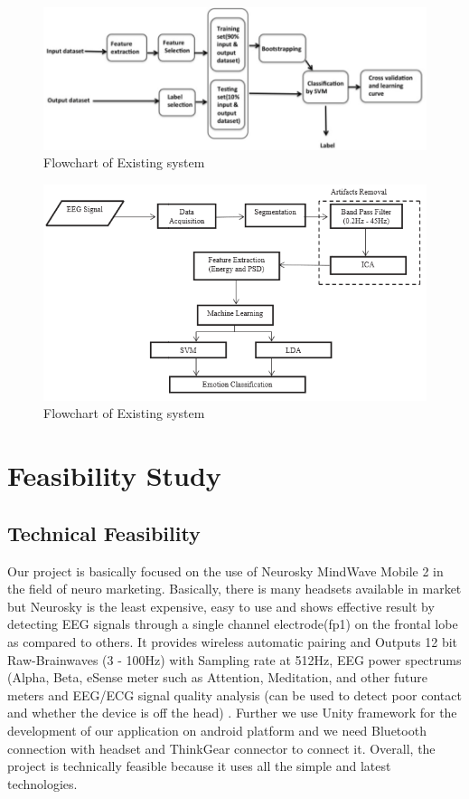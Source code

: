 \documentclass[a4paper, 12pt, oneside]{uet_thesis}
\begin{document}
\begin{figure}[htbp]
\centerline{\includegraphics[scale=0.7]{Existing2.png}}
\caption{Flowchart of Existing system  \cite{b15} }
\label{Table4}
\end{figure}
\newpage
\begin{figure}[htbp]
\centerline{\includegraphics[scale=0.8]{Existing3.png}}
\caption{Flowchart of Existing system  \cite{b18}}
\label{Table4}
\end{figure}



\newpage
\chapter{Feasibility Study}
\section{Technical Feasibility}

Our project is basically focused on the use of Neurosky MindWave Mobile 2 in the field of neuro marketing. Basically, there is many headsets available in market but Neurosky is the least expensive, easy to use and shows effective result by detecting EEG signals through a single channel electrode(fp1) on the frontal lobe as compared to others. It provides wireless automatic pairing and Outputs 12 bit Raw-Brainwaves (3 - 100Hz) with Sampling rate at 512Hz, EEG power spectrums (Alpha, Beta, eSense meter such as Attention, Meditation, and other future meters and EEG/ECG signal quality analysis (can be used to detect poor contact and whether the device is off the head) \cite{b24}. Further we use Unity framework for the development of our application on android platform and we need Bluetooth connection with headset and ThinkGear connector to connect it. Overall, the project is technically feasible because it uses all the simple and latest technologies.
\end{document}
